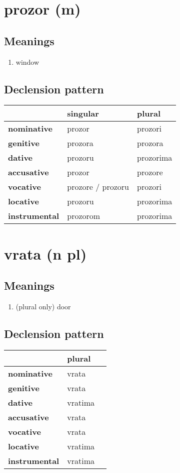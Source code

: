 \filbreak
\section{prozor (m)}
\subsection*{Meanings}
\begin{enumerate}
\item window
\end{enumerate}
\subsection*{Declension pattern}
\begin{tabularx}{\linewidth}{Xll}
\toprule
{} &           singular &     plural \\
\midrule
\textbf{nominative  } &             prozor &    prozori \\
\textbf{genitive    } &            prozora &    prozora \\
\textbf{dative      } &            prozoru &  prozorima \\
\textbf{accusative  } &             prozor &    prozore \\
\textbf{vocative    } &  prozore / prozoru &    prozori \\
\textbf{locative    } &            prozoru &  prozorima \\
\textbf{instrumental} &           prozorom &  prozorima \\
\bottomrule
\end{tabularx}

\filbreak
\section{vrata (n pl)}
\subsection*{Meanings}
\begin{enumerate}
\item (plural only) door
\end{enumerate}
\subsection*{Declension pattern}
\begin{tabularx}{\linewidth}{Xll}
\toprule
{} &   plural \\
\midrule
\textbf{nominative  } &    vrata \\
\textbf{genitive    } &    vrata \\
\textbf{dative      } &  vratima \\
\textbf{accusative  } &    vrata \\
\textbf{vocative    } &    vrata \\
\textbf{locative    } &  vratima \\
\textbf{instrumental} &  vratima \\
\bottomrule
\end{tabularx}

